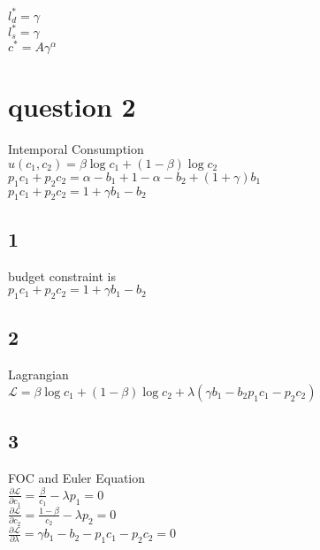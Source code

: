 \documentclass[11pt]{article}
\begin{document}
$l^{*}_{d}=\gamma$\\

$l^{*}_{s}=\gamma$\\


$c^{*}=A\gamma^{\alpha}$\\


\section{question 2}

Intemporal Consumption\\

$u(c_{1},c_{2})=\beta \log c_{1}+(1-\beta )\log c_{2}$\\

$p_{1}c_{1}+p_{2}c_{2}=\alpha-b_{1}+1-\alpha-b_{2}+(1+\gamma)b_{1}$\\

$p_{1}c_{1}+p_{2}c_{2}=1+\gamma b_{1}-b_{2}$\\


\subsection{1}
budget constraint is\\
$p_{1}c_{1}+p_{2}c_{2}=1+\gamma b_{1}-b_{2}$\\

\subsection{2}

Lagrangian\\
$\mathcal{L}=\beta \log c_{1}+(1-\beta )\log c_{2} +\lambda(\gamma b_{1}-b_{2}p_{1}c_{1}-p_{2}c_{2})$

\subsection{3}
FOC and Euler Equation\\

$\frac{ \partial \mathcal{L}}{\partial c_{1}}=\frac{\beta}{c_{1}}-\lambda p_{1}=0$\\


$\frac{ \partial \mathcal{L}}{\partial c_{2}}=\frac{1-\beta}{c_{2}}-\lambda p_{2}=0$\\

$\frac{ \partial \mathcal{L}}{\partial \lambda}=\gamma b_{1}-b_{2}-p_{1}c_{1}-p_{2}c_{2}=0$\\
\end{document}
